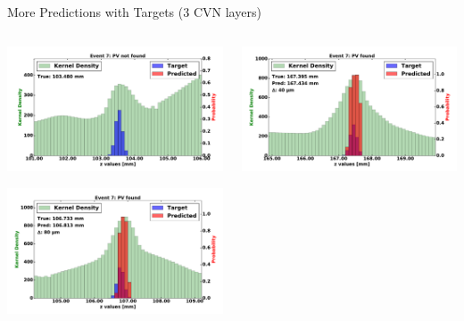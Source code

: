 \begin{frame}{More Predictions with Targets (3 CVN layers)}
  \begin{columns}[c]
        \begin{center}
            \includegraphics[width=1\textwidth,height=0.45\textwidth, trim=18 0 18 0]{images/120000_3layer_45.pdf}
    
            \includegraphics[width=1\textwidth, height=0.45\textwidth,trim=18 0 18 0]{images/120000_3layer_46.pdf}

        \end{center}
        \begin{center}
           \includegraphics[width=1\textwidth, height=0.45\textwidth, trim=18 0 18 0]{images/120000_3layer_47.pdf}
    

\end{center}
\end{columns}
\end{frame}
